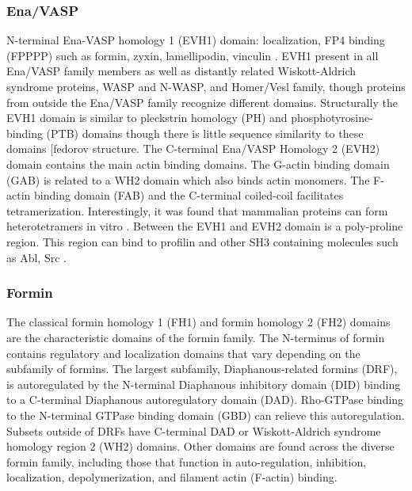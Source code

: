 \subsubsection{Ena/VASP}
N-terminal Ena-VASP homology 1 (EVH1) domain: localization, FP4 binding (FPPPP) such as formin, zyxin, lamellipodin, vinculin \citep{ball_dual_2000,niebuhr_novel_1997,klostermann_orthologous_2000}.
EVH1 present in all Ena/VASP family members as well as distantly related Wiskott-Aldrich syndrome proteins, WASP and N-WASP, and Homer/Vesl family, though proteins from outside the Ena/VASP family recognize different domains. Structurally the EVH1 domain is similar to pleckstrin homology (PH) and phosphotyrosine-binding (PTB) domains though there is little sequence similarity to these domains \citep{prehoda_structure_1999,reinhard_actin-based_2001,ball_dual_2000} [fedorov structure.
The C-terminal Ena/VASP Homology 2 (EVH2) domain contains the main actin binding domains. The G-actin binding domain (GAB) is related to a WH2 domain which also binds actin monomers. The F-actin binding domain (FAB) and the C-terminal coiled-coil facilitates tetramerization. Interestingly, it was found that mammalian proteins can form heterotetramers in vitro \citep{riquelme_selectivity_2015}. 
Between the EVH1 and EVH2 domain is a poly-proline region. This region can bind to profilin and other SH3 containing molecules such as Abl, Src \citep{lanier_abl_2000,gertler_mena_1996}.

\subsubsection{Formin}
The classical formin homology 1 (FH1) and formin homology 2 (FH2) domains are the characteristic  domains of the formin family. The N-terminus of formin contains regulatory and localization domains that vary depending on the subfamily of formins. The largest subfamily, Diaphanous-related formins (DRF), is autoregulated by the N-terminal Diaphanous inhibitory domain (DID) binding to a C-terminal Diaphanous autoregulatory domain (DAD).  Rho-GTPase binding to the N-terminal GTPase binding domain (GBD) can relieve this autoregulation. Subsets outside of DRFs have C-terminal DAD or Wiskott-Aldrich syndrome homology region 2 (WH2) domains. Other domains are found across the diverse formin family, including those that function in auto-regulation, inhibition, localization, depolymerization, and filament actin (F-actin) binding.

